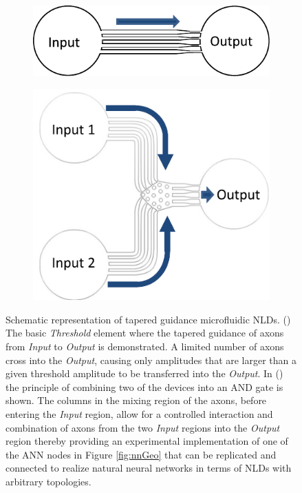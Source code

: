\begin{figure}
\begin{center}
\begin{subfigure}[b]{0.45\linewidth}
\begin{center}
\includegraphics[width=.9\linewidth]{../fig/expdesign1a.pdf}\caption{}\label{fig:expdesign1a}
\end{center}
\end{subfigure}
\begin{subfigure}[b]{0.45\linewidth}
\begin{center}
\includegraphics[width=0.7\linewidth]{../fig/expdesign1b.png}\caption{}\label{fig:expdesign1b}
\end{center}
\end{subfigure}
\caption{Schematic representation of tapered guidance microfluidic NLDs. () The basic {\it Threshold} element where the tapered guidance of axons from {\it Input} to {\it Output} is demonstrated. A limited number of axons cross into the {\it Output}, causing only amplitudes that are larger than a given threshold amplitude to be transferred into the {\it Output}. In () the principle of combining two of the devices into an AND gate is shown. The columns in the mixing region of the axons, before entering the {\it Input} region, allow for a controlled interaction and combination of axons from the two {\it Input} regions into the {\it Output} region thereby providing an experimental implementation of one of the ANN nodes in Figure \ref{fig:nnGeo} that can be replicated and connected to realize natural neural networks in terms of NLDs with arbitrary topologies.}\label{fig:expdesign}
\end{center}
\end{figure}

